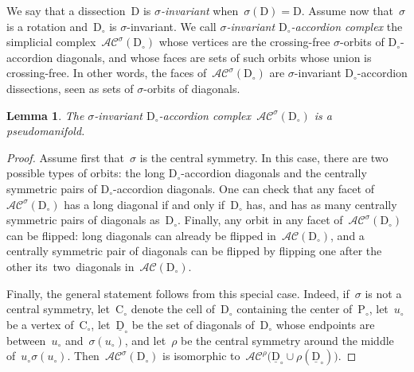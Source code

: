 \documentclass{amsart}
\newtheorem{lemma}[theorem]{Lemma}
\theoremstyle{definition}
\newcommand{\darkblue}{\color{darkblue}} %
\newcommand{\defn}[1]{\textsl{\darkblue #1}} %
\newcommand{\accordionComplex}{\mathcal{AC}} %
\newcommand{\polygon}{\mathrm{P}} %
\newcommand{\dissection}{\mathrm{D}} %
\newcommand{\cell}{\mathrm{C}} %
\begin{document}

We say that a dissection~$\dissection$ is \defn{$\sigma$-invariant} when~$\sigma(\dissection) = \dissection$. Assume now that~$\sigma$ is a rotation and~$\dissection_\circ$ is $\sigma$-invariant. We call \defn{$\sigma$-invariant $\dissection_\circ$-accordion complex} the simplicial complex~$\accordionComplex^\sigma(\dissection_\circ)$ whose vertices are the crossing-free $\sigma$-orbits of $\dissection_\circ$-accordion diagonals, and whose faces are sets of such orbits whose union is crossing-free. In other words, the faces of~$\accordionComplex^\sigma(\dissection_\circ)$ are $\sigma$-invariant $\dissection_\circ$-accordion dissections, seen as sets of $\sigma$-orbits of diagonals. 

\begin{lemma}
The $\sigma$-invariant $\dissection_\circ$-accordion complex~$\accordionComplex^\sigma(\dissection_\circ)$ is a pseudomanifold.
\end{lemma}

\begin{proof}
Assume first that~$\sigma$ is the central symmetry. In this case, there are two possible types of orbits: the long $\dissection_\circ$-accordion diagonals and the centrally symmetric pairs of $\dissection_\circ$-accordion diagonals. One can check that any facet of~$\accordionComplex^\sigma(\dissection_\circ)$ has a long diagonal if and only if~$\dissection_\circ$ has, and has as many centrally symmetric pairs of diagonals as~$\dissection_\circ$. Finally, any orbit in any facet of~$\accordionComplex^\sigma(\dissection_\circ)$ can be flipped: long diagonals can already be flipped in~$\accordionComplex(\dissection_\circ)$, and a centrally symmetric pair of diagonals can be flipped by flipping one after the other its~two~diagonals in~$\accordionComplex(\dissection_\circ)$.

Finally, the general statement follows from this special case. Indeed, if~$\sigma$ is not a central symmetry, let~$\cell_\circ$ denote the cell of~$\dissection_\circ$ containing the center of~$\polygon_\circ$, let~$u_\circ$ be a vertex of~$\cell_\circ$, let~$\underline{\dissection}_\circ$ be the set of diagonals of~$\dissection_\circ$ whose endpoints are between~$u_\circ$ and~$\sigma(u_\circ)$, and let~$\rho$ be the central symmetry around the middle of~$u_\circ \sigma(u_\circ)$. Then~$\accordionComplex^\sigma(\dissection_\circ)$ is isomorphic to~${\accordionComplex^\rho \big( \underline{\dissection}_\circ \cup \rho(\underline{\dissection}_\circ) \big)}$.
\end{proof}
\end{document}
